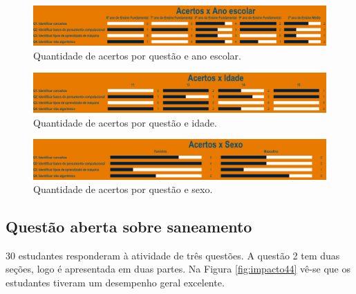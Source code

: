 \documentclass[
]{book}
\begin{document}
\begin{figure}

{\centering \includegraphics[width=0.75\linewidth,height=0.75\textheight]{images/Impactos/41} 

}

\caption{Quantidade de acertos por questão e ano escolar.}\label{fig:impacto41}
\end{figure}

\begin{figure}

{\centering \includegraphics[width=0.75\linewidth,height=0.75\textheight]{images/Impactos/42} 

}

\caption{Quantidade de acertos por questão e idade.}\label{fig:impacto42}
\end{figure}

\begin{figure}

{\centering \includegraphics[width=0.75\linewidth,height=0.75\textheight]{images/Impactos/43} 

}

\caption{Quantidade de acertos por questão e sexo.}\label{fig:impacto43}
\end{figure}

\hypertarget{questuxe3o-aberta-sobre-saneamento}{%
\subsection{Questão aberta sobre saneamento}\label{questuxe3o-aberta-sobre-saneamento}}

30 estudantes responderam à atividade de três questões. A questão 2 tem duas seções, logo é apresentada em duas partes. Na Figura \ref{fig:impacto44} vê-se que os estudantes tiveram um desempenho geral excelente.
\end{document}
